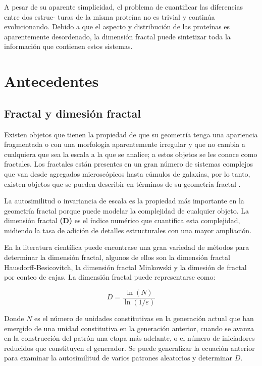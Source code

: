 \documentclass[11pt]{article}
\begin{document}
A pesar de su aparente simplicidad, el problema de cuantificar las diferencias entre dos estruc-
turas de la misma prote\'{i}na no es trivial y continúa evolucionando. Debido a que el aspecto y distribuci\'{o}n de las prote\'{i}nas es aparentemente desordenado, la dimensi\'{o}n fractal  puede sintetizar toda la informaci\'{o}n que contienen estos sistemas. 



\section{Antecedentes}

\subsection{Fractal y dimesi\'{o}n fractal}
\label{subsec:subseccion2.1}


Existen objetos que tienen la propiedad de que su geometr\'{i}a tenga una apariencia fragmentada o con una morfolog\'{i}a aparentemente irregular y que no cambia a cualquiera que sea la escala a la que se analice; a estos objetos se les conoce como fractales. Los fractales est\'{a}n presentes en un gran n\'{u}mero de sistemas complejos que van desde agregados microsc\'{o}picos hasta c\'{u}mulos de galaxias, por lo tanto, existen objetos que se pueden describir en t\'{e}rminos de su geometr\'{i}a fractal \cite{Vicsek1992}. 

La autosimilitud o invariancia de escala es la propiedad m\'{a}s importante en la geometr\'{i}a fractal porque puede modelar la complejidad de cualquier objeto. La dimensi\'{o}n fractal \textbf{(D)} es el \'{i}ndice num\'{e}rico que cuantifica esta complejidad, midiendo la tasa de adici\'{o}n de detalles estructurales con una mayor ampliaci\'{o}n.

En la literatura cient\'{i}fica puede encontrase una gran variedad de m\'{e}todos para determinar la dimensi\'{o}n fractal, algunos de ellos son la dimensi\'{o}n fractal Hausdorff-Besicovitch, la dimensi\'{o}n fractal Minkowski y la dimesi\'{o}n de fractal por conteo de cajas. La dimensi\'{o}n fractal puede representarse como:

\begin{equation}
 D = \frac{\ln(N)}{\ln(1/\varepsilon)}
\end{equation}

Donde \(N\) es el n\'{u}mero de unidades constitutivas en la generaci\'{o}n actual que han emergido de una unidad constitutiva en la generaci\'{o}n anterior, cuando se avanza en la construcci\'{o}n del patr\'{o}n una etapa m\'{a}s adelante, o el n\'{u}mero de iniciadores reducidos que constituyen el generador. Se puede generalizar la ecuaci\'{o}n anterior para examinar la autosimilitud de varios patrones aleatorios y determinar \(D\).
 
\end{document}
